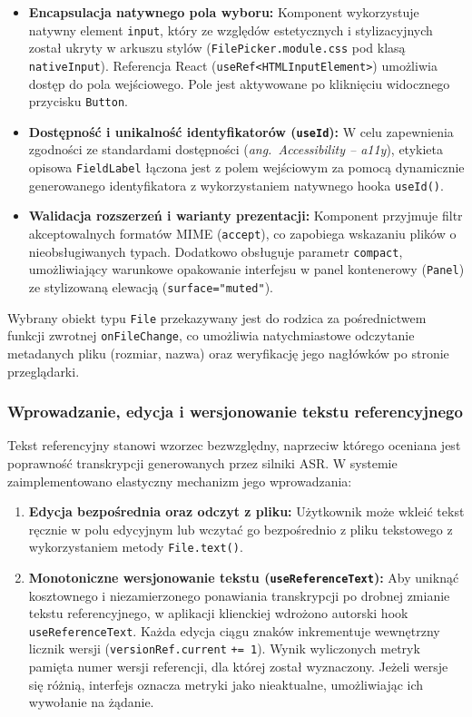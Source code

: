 \begin{itemize}
    \item \textbf{Encapsulacja natywnego pola wyboru:} Komponent wykorzystuje natywny element \texttt{input}, który ze względów estetycznych i stylizacyjnych został ukryty w arkuszu stylów (\texttt{FilePicker.module.css} pod klasą \texttt{nativeInput}).
    Referencja React (\texttt{useRef<}\allowbreak\texttt{HTMLInputElement>}) umożliwia dostęp do pola wejściowego. Pole jest aktywowane po kliknięciu widocznego przycisku \texttt{Button}.
    \item \textbf{Dostępność i unikalność identyfikatorów (\texttt{useId}):} W celu zapewnienia zgodności ze standardami dostępności (\textit{ang.~Accessibility -- a11y}), etykieta opisowa \texttt{FieldLabel} łączona jest z polem wejściowym za pomocą dynamicznie generowanego identyfikatora z wykorzystaniem natywnego hooka \texttt{useId()}.
    \item \textbf{Walidacja rozszerzeń i warianty prezentacji:} Komponent przyjmuje filtr akceptowalnych formatów MIME (\texttt{accept}), co zapobiega wskazaniu plików o nieobsługiwanych typach. Dodatkowo obsługuje parametr \texttt{compact}, umożliwiający warunkowe opakowanie interfejsu w panel kontenerowy (\texttt{Panel}) ze stylizowaną elewacją (\texttt{surface="muted"}).
\end{itemize}




Wybrany obiekt typu \texttt{File} przekazywany jest do rodzica za pośrednictwem funkcji zwrotnej \texttt{onFileChange}, co umożliwia natychmiastowe odczytanie metadanych pliku (rozmiar, nazwa) oraz weryfikację jego nagłówków po stronie przeglądarki.

\subsubsection{Wprowadzanie, edycja i wersjonowanie tekstu referencyjnego}

Tekst referencyjny stanowi wzorzec bezwzględny, naprzeciw którego oceniana jest poprawność transkrypcji generowanych przez silniki ASR. W systemie zaimplementowano elastyczny mechanizm jego wprowadzania:
\begin{enumerate}
    \item \textbf{Edycja bezpośrednia oraz odczyt z pliku:} Użytkownik może wkleić tekst ręcznie w polu edycyjnym lub wczytać go bezpośrednio z pliku tekstowego z wykorzystaniem metody \texttt{File.text()}.
    \item \textbf{Monotoniczne wersjonowanie tekstu (\texttt{useReferenceText}):} Aby uniknąć kosztownego i niezamierzonego ponawiania transkrypcji po drobnej zmianie tekstu referencyjnego, w aplikacji klienckiej wdrożono autorski hook \texttt{useReferenceText}. Każda edycja ciągu znaków inkrementuje wewnętrzny licznik wersji (\texttt{versionRef.current} \texttt{+= 1}). Wynik wyliczonych metryk pamięta numer wersji referencji, dla której został wyznaczony. Jeżeli wersje się różnią, interfejs oznacza metryki jako nieaktualne, umożliwiając ich wywołanie na żądanie.
\end{enumerate}

